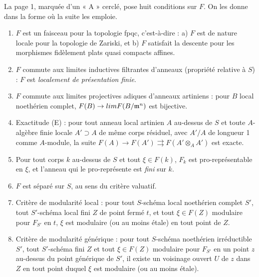 \documentclass[11pt,a4paper]{article}
\begin{document}
La page 1, marquée d'un « A » cerclé, pose huit conditions sur $F$. On les
donne dans la forme où la suite les emploie.
\begin{enumerate}
\item[1°] $F$ est un faisceau pour la topologie fpqc, c'est-à-dire : a) $F$
est de nature locale pour la topologie de Zariski, et b) $F$ satisfait la
descente pour les morphismes fidèlement plats quasi compacts affines.
\item[2°] $F$ commute aux limites inductives filtrantes d'anneaux (propriété
relative à $S$) : $F$ est \emph{localement de présentation finie}.
\item[3°] $F$ commute aux limites projectives adiques d'anneaux artiniens :
pour $B$ local noethérien complet, $F(B) \to \varprojlim F(B/\mathfrak{m}^n)$
est bijective.
\item[4°] Exactitude (E) : pour tout anneau local artinien $A$ au-dessus de
$S$ et toute $A$-algèbre finie locale $A' \supset A$ de même corps résiduel,
avec $A'/A$ de longueur 1 comme $A$-module, la suite
$F(A) \to F(A') \rightrightarrows F(A' \otimes_A A')$ est exacte.
\item[5°] Pour tout corps $k$ au-dessus de $S$ et tout $\xi \in F(k)$, $F_k$
est pro-représentable en $\xi$, et l'anneau qui le pro-représente est
\emph{fini} sur $k$.
\item[6°] $F$ est séparé sur $S$, au sens du critère valuatif.
\item[7°] Critère de modularité local : pour tout $S$-schéma local
noethérien complet $S'$, tout $S'$-schéma local fini $Z$ de point fermé $t$,
et tout $\xi \in F(Z)$ modulaire pour $F_{S'}$ en $t$, $\xi$ est modulaire
(ou au moins étale) en tout point de $Z$.
\item[8°] Critère de modularité générique : pour tout $S$-schéma noethérien
irréductible $S'$, tout $S'$-schéma fini $Z$ et tout $\xi \in F(Z)$ modulaire
pour $F_{S'}$ en un point $z$ au-dessus du point générique de $S'$, il existe
un voisinage ouvert $U$ de $z$ dans $Z$ en tout point duquel $\xi$ est
modulaire (ou au moins étale).
\end{enumerate}
\end{document}

